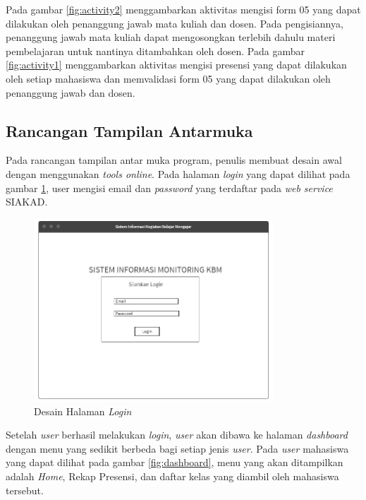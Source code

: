 Pada gambar \ref{fig:activity2} menggambarkan aktivitas mengisi form 05 yang dapat dilakukan oleh penanggung jawab mata kuliah dan dosen. Pada pengisiannya, penanggung jawab mata kuliah dapat mengosongkan terlebih dahulu materi pembelajaran untuk nantinya ditambahkan oleh dosen.
Pada gambar \ref{fig:activity1} menggambarkan aktivitas mengisi presensi yang dapat dilakukan oleh setiap mahasiswa dan memvalidasi form 05 yang dapat dilakukan oleh penanggung jawab dan dosen.

\subsection{Rancangan Tampilan Antarmuka}

Pada rancangan tampilan antar muka program, penulis membuat desain awal dengan menggunakan \textit{tools online}. Pada halaman \textit{login} yang dapat dilihat pada gambar \ref{fig:login}, user mengisi email dan \textit{password} yang terdaftar pada \textit{web service} SIAKAD.

\begin{figure}[h!]
	\centering
	\includegraphics[width=0.8\textwidth]{gambar/mockup/login}
	\caption{Desain Halaman \textit{Login}}
	\label{fig:login}
\end{figure}

Setelah \textit{user} berhasil melakukan \textit{login}, \textit{user} akan dibawa ke halaman \textit{dashboard} dengan menu yang sedikit berbeda bagi setiap jenis \textit{user}. Pada \textit{user} mahasiswa yang dapat dilihat pada gambar \ref{fig:dashboard}, menu yang akan ditampilkan adalah \textit{Home}, Rekap Presensi, dan daftar kelas yang diambil oleh mahasiswa tersebut.

